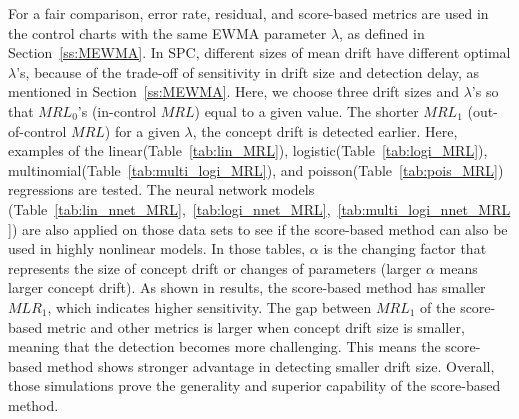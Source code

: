 \documentclass[twoside,11pt]{article}
\begin{document}
\begin{appendix}
For a fair comparison, error rate, residual, and score-based metrics are used in the control charts with the same EWMA parameter $\lambda$, as defined in Section~\ref{ss:MEWMA}. In SPC, different sizes of mean drift have different optimal $ \lambda$'s, because of the trade-off of sensitivity in drift size and detection delay, as mentioned in Section~\ref{ss:MEWMA}. Here, we choose three drift sizes and $ \lambda$'s so that $MRL_0$'s (in-control $MRL$) equal to a given value. The shorter $MRL_1$ (out-of-control $MRL$) for a given $ \lambda$, the concept drift is detected earlier. Here, examples of the linear(Table~\ref{tab:lin_MRL}), logistic(Table~\ref{tab:logi_MRL}), multinomial(Table~\ref{tab:multi_logi_MRL}), and poisson(Table~\ref{tab:pois_MRL}) regressions are tested. The neural network models (Table~\ref{tab:lin_nnet_MRL},~\ref{tab:logi_nnet_MRL},~\ref{tab:multi_logi_nnet_MRL}) are also applied on those data sets to see if the score-based method can also be used in highly nonlinear models. In those tables, $ \alpha$ is the changing factor that represents the size of concept drift or changes of parameters (larger $ \alpha$ means larger concept drift). As shown in results, the score-based method has smaller $MLR_1$, which indicates higher sensitivity. The gap between $MRL_1$ of the score-based metric and other metrics is larger when concept drift size is smaller, meaning that the detection becomes more challenging. This means the score-based method shows stronger advantage in detecting smaller drift size. Overall, those simulations prove the generality and superior capability of the score-based method.


\end{appendix}
\end{document}
